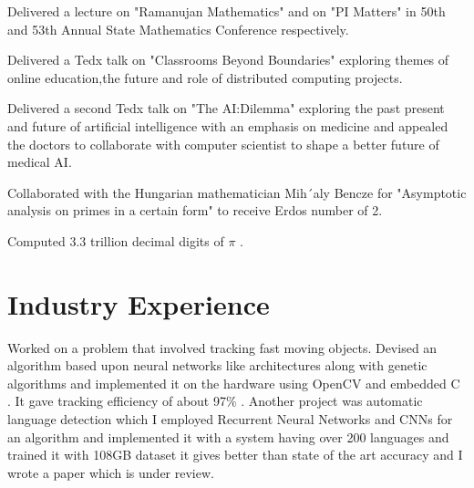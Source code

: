 \documentclass[]{deedy-resume-openfont}
\begin{document}
\begin{tightemize}\item Delivered a lecture on "Ramanujan Mathematics" and on "PI Matters" in 50th and 53th Annual  State Mathematics Conference respectively.
\end{tightemize}
\sectionsep

\begin{tightemize}
\item Delivered a Tedx talk on "Classrooms Beyond Boundaries" exploring themes of online education,the future and role of distributed computing projects.

\item Delivered a second Tedx talk on "The AI:Dilemma" exploring the past present and future of artificial intelligence with an emphasis on medicine and appealed the doctors to collaborate with computer scientist to shape a better future of medical AI.


\end{tightemize}
\sectionsep

\begin{tightemize}
\item Collaborated with the Hungarian mathematician Mih´aly Bencze for "Asymptotic analysis on primes in a certain form" to receive Erdos number of 2.

\end{tightemize}
\sectionsep

\begin{tightemize}
\item Computed $3.3$ trillion decimal digits of $\pi$ .
\end{tightemize}
\sectionsep



\section{Industry Experience}

Worked on a problem that involved tracking fast moving objects. Devised an algorithm based upon neural networks like architectures along with genetic algorithms and implemented it on the hardware using OpenCV and embedded C . It gave tracking efficiency of about 97\% . 
Another project was automatic language detection which I employed Recurrent Neural Networks and CNNs for an algorithm and implemented it with a system having over 200 languages and trained it with 108GB dataset it gives better than state of the art accuracy and I wrote a paper which is under review.
\end{document}
